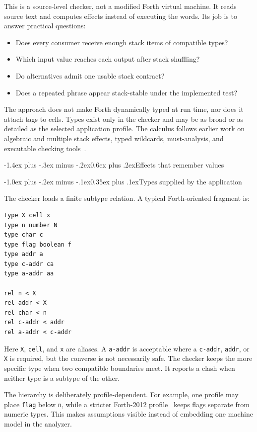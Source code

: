 \documentclass[a4paper,10pt]{article}
\makeatletter
\renewcommand\section{\@startsection{section}{1}{\z@}%
  {-1.4ex plus -.3ex minus -.2ex}{0.6ex plus .2ex}{\large\bfseries}}
\renewcommand\subsection{\@startsection{subsection}{2}{\z@}%
  {-1.0ex plus -.2ex minus -.1ex}{0.35ex plus .1ex}{\normalsize\bfseries}}
\makeatother
\begin{document}
This is a source-level checker, not a modified Forth virtual machine.  It reads
source text and computes effects instead of executing the words.  Its job is to
answer practical questions:
\begin{itemize}
  \item Does every consumer receive enough stack items of compatible types?
  \item Which input value reaches each output after stack shuffling?
  \item Do alternatives admit one usable stack contract?
  \item Does a repeated phrase appear stack-stable under the implemented test?
\end{itemize}

The approach does not make Forth dynamically typed at run time, nor does it
attach tags to cells.  Types exist only in the checker and may be as broad or
as detailed as the selected application profile.  The calculus follows earlier
work on algebraic and multiple stack effects, typed wildcards, must-analysis,
and executable checking tools~\cite{poial1991,poial1992,poial2002,poial2006,poial2008}.

\section{Effects that remember values}

\subsection{Types supplied by the application}

The checker loads a finite subtype relation.  A typical Forth-oriented fragment
is:
\begin{lstlisting}
type X cell x
type n number N
type char c
type flag boolean f
type addr a
type c-addr ca
type a-addr aa

rel n < X
rel addr < X
rel char < n
rel c-addr < addr
rel a-addr < c-addr
\end{lstlisting}
Here \texttt{X}, \texttt{cell}, and \texttt{x} are aliases.  A
\texttt{a-addr} is acceptable where a \texttt{c-addr}, \texttt{addr}, or
\texttt{X} is required, but the converse is not necessarily safe.  The
checker keeps the more specific type when two compatible boundaries meet.  It
reports a clash when neither type is a subtype of the other.

The hierarchy is deliberately profile-dependent.  For example, one profile
may place \texttt{flag} below \texttt{n}, while a stricter Forth-2012
profile~\cite{forth2012} keeps flags separate from numeric types.  This makes assumptions visible
instead of embedding one machine model in the analyzer.
\end{document}
